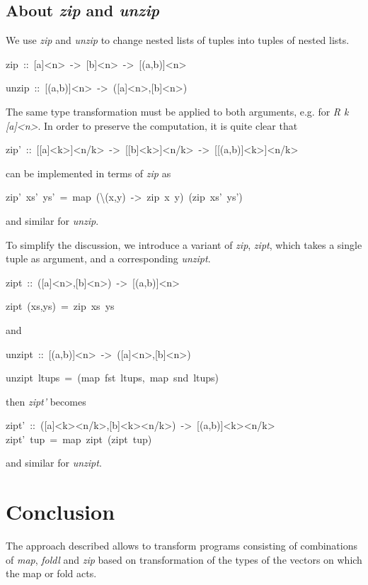 \documentclass{article}
\newenvironment{lyxcode}
{\par\begin{list}{}{
\setlength{\rightmargin}{\leftmargin}
\setlength{\listparindent}{0pt}\raggedright
\setlength{\itemsep}{0pt}
\setlength{\parsep}{0pt}
\normalfont\ttfamily}\item[]}
{\end{list}}
\begin{document}
\subsection{About \emph{zip} and \emph{unzip} }



We use \emph{zip} and \emph{unzip} to change nested lists of tuples
into tuples of nested lists. 
\begin{lyxcode}
zip~::~{[}a{]}<n>~->~{[}b{]}<n>~->~{[}(a,b){]}<n>

unzip~::~{[}(a,b){]}<n>~->~({[}a{]}<n>,{[}b{]}<n>)
\end{lyxcode}
The same type transformation must be applied to both arguments, e.g.
for \emph{R k {[}a{]}<n>}. In order to preserve the computation, it
is quite clear that
\begin{lyxcode}
zip'~::~{[}{[}a{]}<k>{]}<n/k>~->~{[}{[}b{]}<k>{]}<n/k>~->~{[}{[}(a,b){]}<k>{]}<n/k>
\end{lyxcode}
can be implemented in terms of \emph{zip} as
\begin{lyxcode}
zip'~xs'~ys'~=~map~(\textbackslash{}(x,y)~->~zip~x~y)~(zip~xs'~ys')
\end{lyxcode}
and similar for \emph{unzip}.

To simplify the discussion, we introduce a variant of \emph{zip},
\emph{zipt}, which takes a single tuple as argument, and a corresponding
\emph{unzipt}.
\begin{lyxcode}
zipt~::~({[}a{]}<n>,{[}b{]}<n>)~->~{[}(a,b){]}<n>

zipt~(xs,ys)~=~zip~xs~ys
\end{lyxcode}
and
\begin{lyxcode}
unzipt~::~{[}(a,b){]}<n>~->~({[}a{]}<n>,{[}b{]}<n>)

unzipt~ltups~=~(map~fst~ltups,~map~snd~ltups)
\end{lyxcode}
then \emph{zipt'} becomes 
\begin{lyxcode}
zipt'~::~({[}a{]}<k><n/k>,{[}b{]}<k><n/k>)~->~{[}(a,b){]}<k><n/k>
zipt'~tup~=~map~zipt~(zipt~tup)
\end{lyxcode}
and similar for \emph{unzipt}.

\section{Conclusion}

The approach described allows to transform programs consisting of
combinations of \emph{map}, \emph{foldl} and \emph{zip} based on transformation of the types
of the vectors on which the map or fold acts. 
\end{document}

